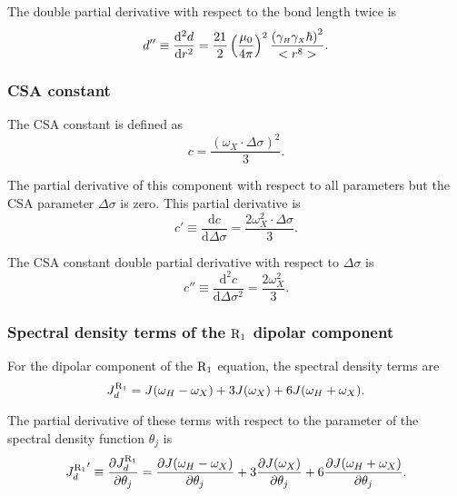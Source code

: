 \noindent The double partial derivative with respect to the bond length twice is
\begin{equation}
    d'' \equiv \frac{\mathrm{d}^2 d}{\mathrm{d} r^2} = \frac{21}{2} \left(\frac{\mu_0}{4\pi}\right)^2 \frac{\left( \gamma_{\scriptscriptstyle H} \gamma_{\scriptscriptstyle X} \hbar \right)^2}{<r^8>}. \label{eq: Ri': d"}
\end{equation}


\subsubsection{CSA constant}

The CSA constant is defined as
\begin{equation}
    c = \frac{\left(\omega_X \cdot \Delta\sigma \right)^2}{3}. \label{eq: Ri': c}
\end{equation}

\noindent The partial derivative of this component with respect to all parameters but the CSA parameter $\Delta\sigma$ is zero.  This partial derivative is
\begin{equation}
    c' \equiv \frac{\mathrm{d} c}{\mathrm{d} \Delta\sigma} = \frac{2 \omega_X^2 \cdot \Delta\sigma}{3}. \label{eq: Ri': c'}
\end{equation}

\noindent The CSA constant double partial derivative with respect to $\Delta\sigma$ is
\begin{equation}
    c'' \equiv \frac{\mathrm{d}^2 c}{\mathrm{d} \Delta\sigma^2} = \frac{2 \omega_X^2}{3}. \label{eq: Ri': c"}
\end{equation}


\subsubsection{Spectral density terms of the $\mathrm{R}_1$ dipolar component}

For the dipolar component of the $\mathrm{R}_1$ equation, the spectral density terms are
\begin{equation}
    J_d^{\mathrm{R}_1} = J(\omega_H - \omega_X) + 3J(\omega_X) + 6J(\omega_H + \omega_X).  \label{eq: J terms: JR1d}
\end{equation}

\noindent The partial derivative of these terms with respect to the parameter of the spectral density function $\theta_j$ is
\begin{equation}
    {J_d^{\mathrm{R}_1}}' \equiv \frac{\partial J_d^{\mathrm{R}_1}}{\partial \theta_j}
        = \frac{\partial J(\omega_H - \omega_X)}{\partial \theta_j}
        + 3 \frac{\partial J(\omega_X)}{\partial \theta_j}
        + 6 \frac{\partial J(\omega_H + \omega_X)}{\partial \theta_j}.  \label{eq: J terms: JR1d'}
\end{equation}

